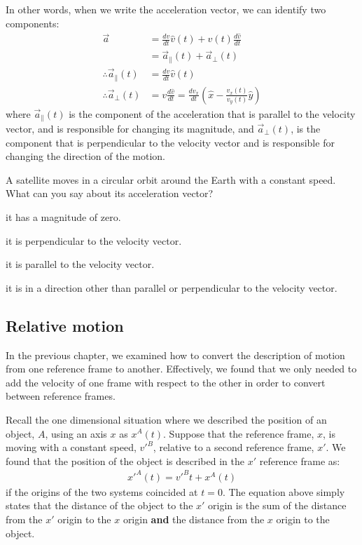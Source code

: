 In other words, when we write the acceleration vector, we can identify two components:
\begin{align*}
\vec a&=\frac{dv}{dt}\hat v(t)+v(t)\frac{d\hat v}{dt}\\
&=\vec a_{\parallel}(t) + \vec a_{\bot}(t)\\
\therefore \vec a_{\parallel}(t)&=\frac{dv}{dt}\hat v(t)\\
\therefore \vec a_{\bot}(t)&=v\frac{d\hat v}{dt}=\frac{dv_x}{dt} \left(\hat x - \frac{v_x(t)}{v_y(t)}\hat y\right)
\end{align*}
where $\vec a_{\parallel}(t)$ is the component of the acceleration that is parallel to the velocity vector, and is responsible for changing its magnitude, and $\vec a_{\bot}(t)$, is the component that is perpendicular to the velocity vector and is responsible for changing the direction of the motion.

\begin{checkpointMC}{A satellite moves in a circular orbit around the Earth with a constant speed. What can you say about its acceleration vector?}
\item it has a magnitude of zero.
\item it is perpendicular to the velocity vector.
\item it is parallel to the velocity vector.
\item it is in a direction other than parallel or perpendicular to the velocity vector.
\end{checkpointMC}

\subsection{Relative motion}
In the previous chapter, we examined how to convert the description of motion from one reference frame to another. Effectively, we found that we only needed to add the velocity of one frame with respect to the other in order to convert between reference frames.

Recall the one dimensional situation where we described the position of an object, $A$, using an axis $x$ as $x^A(t)$. Suppose that the reference frame, $x$, is moving with a constant speed, $v'^B$, relative to a second reference frame, $x'$. We found that the position of the object is described in the $x'$ reference frame as:
\begin{align*}
x'^A(t)=v'^Bt+x^A(t)
\end{align*}
if the origins of the two systems coincided at $t=0$. The equation above simply states that the distance of the object to the $x'$ origin is the sum of the distance from the $x'$ origin to the $x$ origin \textbf{and} the distance from the $x$ origin to the object.

